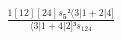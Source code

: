 \documentclass[varwidth, border=5pt]{standalone}
\begin{document}
\begin{my}
$\begin{gathered}
\scriptscriptstyle\frac{1[12][24]s_{𝟓}²⟨3|1+2|4]}{⟨3|1+4|2]³s_{124}}
\end{gathered}$
\end{my}
\end{document}
